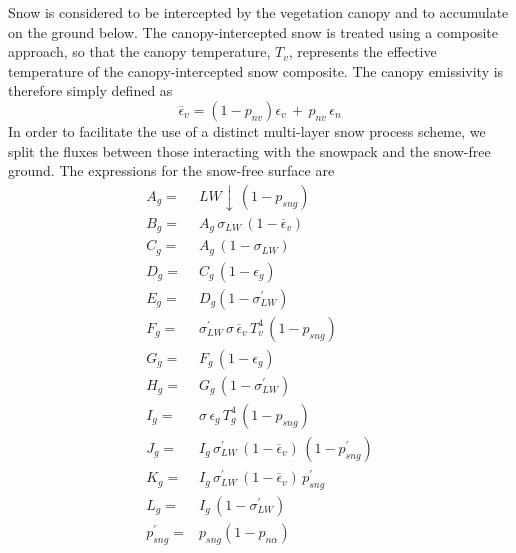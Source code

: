 Snow is considered to be intercepted by the vegetation canopy and to accumulate
on the ground below. 
%
The canopy-intercepted snow is treated using a composite approach,
so that the canopy temperature, $T_v$, represents the effective temperature of
the canopy-intercepted snow composite. The canopy emissivity is therefore simply defined as
%
\begin{equation}
\label{eq:meb_emis_v_n}
%
{\overline\epsilon}_v = \left( 1 - p_{nv}\right) \epsilon_v \,+\, p_{nv}\,\epsilon_{n}
%
\end{equation}
%
%
In order to facilitate the use of a distinct multi-layer snow process
scheme, we
split the fluxes between those interacting with the snowpack and the
snow-free ground.
%
The expressions for the snow-free 
surface 
are
%
\begin{subequations}\label{eq:meb_lw_g_n_terms}
\begin{align}
 \label{eq:meb_lw_g_n_terms_a}
A_{g} = & LW\downarrow \,\left(1-p_{sng}\right)
\\
 \label{eq:meb_lw_g_n_terms_b}
B_{g} = & A_{g}\,\sigma_{LW}\,\left(1-{\overline\epsilon}_v\right)
\\
 \label{eq:meb_lw_g_n_terms_c}
C_{g} = & A_{g}\,\left(1-\sigma_{LW}\right)
\\
 \label{eq:meb_lw_g_n_terms_d}
D_{g} = & C_{g} \,\left(1-\epsilon_g\right)
\\
 \label{eq:meb_lw_g_n_terms_e}
E_{g} = & D_{g}\left(1-\sigma_{LW}^\prime\right)
\\
 \label{eq:meb_lw_g_n_terms_f}
F_{g} = & \sigma_{LW}^\prime\, \sigma \, {\overline\epsilon}_v\, T_v^4\,\left(1-p_{sng}\right)
\\
 \label{eq:meb_lw_g_n_terms_g}
G_{g} = & F_{g}\,\left(1-\epsilon_g\right)
\\
 \label{eq:meb_lw_g_n_terms_h}
H_{g} = & G_{g}\,\left(1-\sigma_{LW}^\prime\right)
\\
 \label{eq:meb_lw_g_n_terms_i}
I_{g} = & \sigma \, \epsilon_g\, T_g^4\,\left(1-p_{sng}\right)
\\
 \label{eq:meb_lw_g_n_terms_j}
J_{g} = & I_{g}\,\sigma_{LW}^\prime\,\left(1-{\overline\epsilon}_v\right) \,\left(1-p_{sng}^\prime\right)
\\
 \label{eq:meb_lw_g_n_terms_k}
K_{g} = & I_{g}\,\sigma_{LW}^\prime\,\left(1-{\overline\epsilon}_v\right) \,p_{sng}^\prime
\\
 \label{eq:meb_lw_g_n_terms_l}
L_{g} = & I_{g}\,\left(1-\sigma_{LW}^\prime\right)
%
\\
 \label{eq:meb_lw_g_n_terms_png}
p_{sng}^\prime = & p_{sng}\left(1-p_{n\alpha}\right)
%
\end{align}
\end{subequations}
